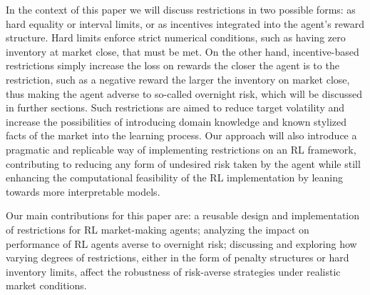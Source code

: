 In the context of this paper we will discuss restrictions in two possible forms: as hard equality or interval limits, or as incentives integrated into the agent's reward structure. Hard limits enforce strict numerical conditions, such as having zero inventory at market close, that must be met. On the other hand, incentive-based restrictions simply increase the loss on rewards the closer the agent is to the restriction, such as a negative reward the larger the inventory on market close, thus making the agent adverse to so-called overnight risk, which will be discussed in further sections. Such restrictions are aimed to reduce target volatility and increase the possibilities of introducing domain knowledge and known stylized facts of the market into the learning process. Our approach will also introduce a pragmatic and replicable way of implementing restrictions on an RL framework, contributing to reducing any form of undesired risk taken by the agent while still enhancing the computational feasibility of the RL implementation by leaning towards more interpretable models.

Our main contributions for this paper are: a reusable design and implementation of restrictions for RL market-making agents; analyzing the impact on performance of RL agents averse to overnight risk; discussing and exploring how varying degrees of restrictions, either in the form of penalty structures or hard inventory limits, affect the robustness of risk-averse strategies under realistic market conditions.